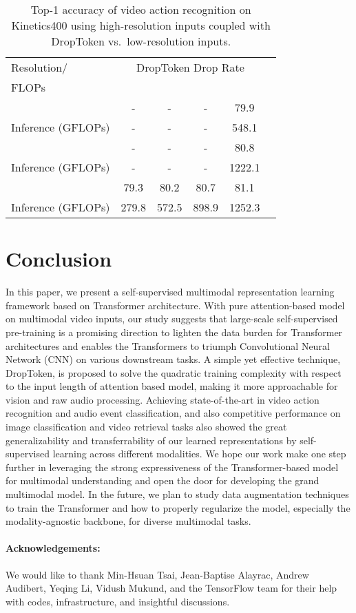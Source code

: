 \documentclass[10pt,twocolumn,letterpaper]{article}
\begin{document}
\begin{table}[h!]
    \small
    \centering
    \setlength{\tabcolsep}{5pt}
    \begin{tabular}{@{}l|ccccc@{}}
    \toprule
    Resolution/ & \multicolumn{4}{c}{DropToken Drop Rate} \\
    \cline{2-5}
    FLOPs &  &  &  &  \\
    \midrule
     & - & - & - & 79.9 \\
    Inference (GFLOPs) & - & - & - & 548.1 \\
    \midrule
     & - & - & - & 80.8 \\
    Inference (GFLOPs) & - & - & - & 1222.1 \\
    \midrule
     & 79.3 & 80.2 & 80.7 & 81.1 \\
    Inference (GFLOPs) & 279.8 & 572.5 & 898.9 & 1252.3 \\
    \bottomrule
    \end{tabular}
    \vspace{2mm}
    \caption{Top-1 accuracy of video action recognition on Kinetics400 using high-resolution inputs coupled with DropToken vs.\ low-resolution inputs.}
    \label{table:drop-token-acc-k400}
    \vspace{-2mm}
\end{table} 
\section{Conclusion}
In this paper, we present a self-supervised multimodal representation learning framework based on Transformer architecture. 
With pure attention-based model on multimodal video inputs, our study suggests that large-scale self-supervised pre-training is a promising direction to lighten the data burden for Transformer architectures and enables the Transformers to triumph Convolutional Neural Network (CNN) on various downstream tasks. 
A simple yet effective technique, DropToken, is proposed to solve the quadratic training complexity with respect to the input length of attention based model, making it more approachable for vision and raw audio processing.
Achieving state-of-the-art in video action recognition and audio event classification, and also competitive performance on image classification and video retrieval tasks also showed the great generalizability and transferrability of our learned representations by self-supervised learning across different modalities.
We hope our work make one step further in leveraging the strong expressiveness of the Transformer-based model for multimodal understanding and open the door for developing the grand multimodal model.
In the future, we plan to study data augmentation techniques to train the Transformer and how to properly regularize the model, especially the modality-agnostic backbone, for diverse multimodal tasks.

\paragraph{Acknowledgements:} We would like to thank Min-Hsuan Tsai, Jean-Baptise Alayrac, Andrew Audibert, Yeqing Li, Vidush Mukund, and the TensorFlow team for their help with codes, infrastructure, and insightful discussions.



{\small


}
\end{document}
